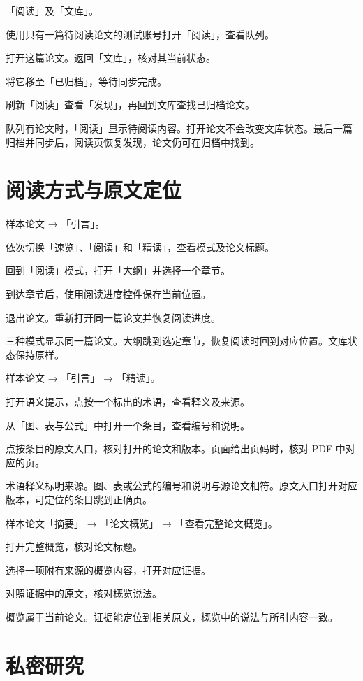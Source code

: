 \documentclass[UTF8,a4paper,zihao=-4,fontset=fandol]{ctexart}
\newcommand{\ui}[1]{「#1」}
\begin{document}
  {\ui{阅读}及\ui{文库}。}
  {\item 使用只有一篇待阅读论文的测试账号打开\ui{阅读}，查看队列。
   \item 打开这篇论文。返回\ui{文库}，核对其当前状态。
   \item 将它移至\ui{已归档}，等待同步完成。
   \item 刷新\ui{阅读}查看\ui{发现}，再回到文库查找已归档论文。}
  {队列有论文时，\ui{阅读}显示待阅读内容。打开论文不会改变文库状态。最后一篇归档并同步后，阅读页恢复发现，论文仍可在归档中找到。}

\clearpage
{}
\section{阅读方式与原文定位}

  {样本论文 → \ui{引言}。}
  {\item 依次切换\ui{速览}、\ui{阅读}和\ui{精读}，查看模式及论文标题。
   \item 回到\ui{阅读}模式，打开\ui{大纲}并选择一个章节。
   \item 到达章节后，使用阅读进度控件保存当前位置。
   \item 退出论文。重新打开同一篇论文并恢复阅读进度。}
  {三种模式显示同一篇论文。大纲跳到选定章节，恢复阅读时回到对应位置。文库状态保持原样。}

  {样本论文 → \ui{引言} → \ui{精读}。}
  {\item 打开语义提示，点按一个标出的术语，查看释义及来源。
   \item 从\ui{图、表与公式}中打开一个条目，查看编号和说明。
   \item 点按条目的原文入口，核对打开的论文和版本。页面给出页码时，核对 PDF 中对应的页。}
  {术语释义标明来源。图、表或公式的编号和说明与源论文相符。原文入口打开对应版本，可定位的条目跳到正确页。}

  {样本论文\ui{摘要} → \ui{论文概览} → \ui{查看完整论文概览}。}
  {\item 打开完整概览，核对论文标题。
   \item 选择一项附有来源的概览内容，打开对应证据。
   \item 对照证据中的原文，核对概览说法。}
  {概览属于当前论文。证据能定位到相关原文，概览中的说法与所引内容一致。}

\clearpage
{}
\section{私密研究}
\end{document}
